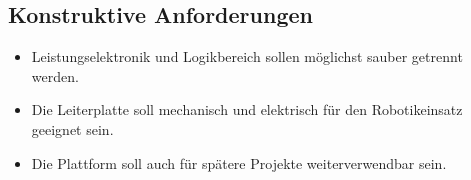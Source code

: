 \subsection{Konstruktive Anforderungen}
\begin{itemize}
	\item Leistungselektronik und Logikbereich sollen möglichst sauber getrennt werden.
	\item Die Leiterplatte soll mechanisch und elektrisch für den Robotikeinsatz geeignet sein.
	\item Die Plattform soll auch für spätere Projekte weiterverwendbar sein.
\end{itemize}

